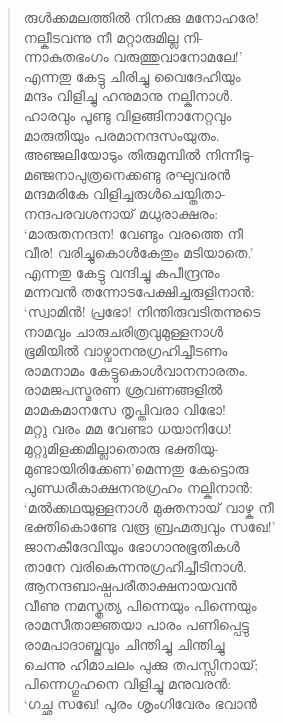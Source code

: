 \begin{verse}
രുള്‍ക്കമലത്തില്‍ നിനക്കു മനോഹരേ!\\
നല്കീടവന്നു നീ മറ്റാരുമില്ല നി-\\
ന്നാകുതഭംഗം വരുത്തുവാനോമലേ!’\\
എന്നതു കേട്ടു ചിരിച്ചു വൈദേഹിയും\\
മന്ദം വിളിച്ചു ഹനുമാനു നല്കിനാള്‍.\\
ഹാരവും പൂണ്ടു വിളങ്ങിനാനേറ്റവും\\
മാരുതിയും പരമാനന്ദസംയുതം.\\
അഞ്ജലിയോടും തിരുമുമ്പില്‍ നിന്നീടു-\\
മഞ്ജനാപുത്രനെക്കണ്ടു രഘുവരന്‍\\
മന്ദമരികേ വിളിച്ചരുള്‍ചെയ്തിതാ-\\
നന്ദപരവശനായ് മധുരാക്ഷരം:\\
‘മാരുതനന്ദന! വേണ്ടും വരത്തെ നീ\\
വീര! വരിച്ചുകൊള്‍കേതും മടിയാതെ.’\\
എന്നതു കേട്ടു വന്ദിച്ചു കപീന്ദ്രനും\\
മന്നവന്‍ തന്നോടപേക്ഷിച്ചരുളിനാന്‍:\\
‘സ്വാമിന്‍! പ്രഭോ! നിന്തിരുവടിതന്നുടെ\\
നാമവും ചാരുചരിത്രവുമുള്ളനാള്‍\\
ഭൂമിയില്‍ വാഴ്വാനനുഗ്രഹിച്ചീടണം\\
രാമനാമം കേട്ടുകൊള്‍വാനനാരതം.\\
രാമജപസ്മരണ ശ്രവണങ്ങളില്‍\\
മാമകമാനസേ തൃപ്തിവരാ വിഭോ!\\
മറ്റു വരം മമ വേണ്ടാ ധയാനിധേ!\\
മുറ്റുമിളക്കമില്ലാതൊരു ഭക്തിയു-\\
മുണ്ടായിരിക്കേണ’മെന്നതു കേട്ടൊരു\\
പുണ്ഡരീകാക്ഷനനുഗ്രഹം നല്കിനാന്‍:\\
‘മല്‍ക്കഥയുള്ളനാള്‍ മുക്തനായ് വാഴ്ക നീ\\
ഭക്തികൊണ്ടേ വരൂ ബ്രഹ്മത്വവും സഖേ!’\\
ജാനകീദേവിയും ഭോഗാനുഭൂതികള്‍\\
താനേ വരികെന്നനുഗ്രഹിച്ചീടിനാള്‍.\\
ആനന്ദബാഷ്പപരീതാക്ഷനായവന്‍\\
വീണു നമസ്കൃത്യ പിന്നെയും പിന്നെയും\\
രാമസീതാജ്ഞയാ പാരം പണിപ്പെട്ടു\\
രാമപാദാബ്ജവും ചിന്തിച്ചു ചിന്തിച്ചു\\
ചെന്നു ഹിമാചലം പുക്കു തപസ്സിനായ്;\\
പിന്നെഗ്ഗുഹനെ വിളിച്ചു മനുവരന്‍:\\
‘ഗച്ഛ സഖേ! പുരം ശൃംഗിവേരം ഭവാന്‍\\

\end{verse}
